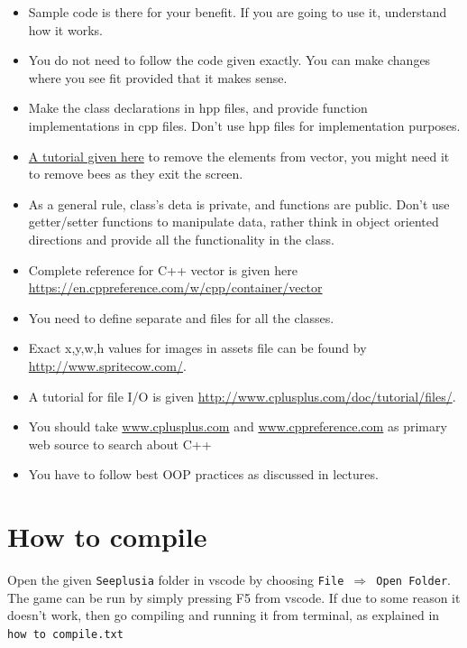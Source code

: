 \documentclass[a4paper,12pt]{article}
\begin{document}
\begin{itemize}
	\item Sample code is there for your benefit. If you are going to use it, understand how it works. 
	\item You do not need to follow the code given exactly. You can make changes where you see fit provided that it makes sense.
	\item Make the class declarations in hpp files, and provide function implementations in cpp files. Don't use hpp files for implementation purposes.
	\item \href{https://www.techiedelight.com/remove-elements-vector-inside-loop-cpp/}{A tutorial given here} to remove the elements from vector, you might need it to remove bees as they exit the screen.
	\item As a general rule, class's deta is private, and functions are public. Don't use getter/setter functions to manipulate data, rather think in object oriented directions and provide all the functionality in the class.
	\item Complete reference for C++ vector is given here \url{https://en.cppreference.com/w/cpp/container/vector}
	\item You need to define separate  and  files for all the classes.
	\item Exact x,y,w,h values for images in assets file can be found by \url{http://www.spritecow.com/}. 
	\item A tutorial for file I/O is given \url{http://www.cplusplus.com/doc/tutorial/files/}. 
	\item You should take \url{www.cplusplus.com} and \url{www.cppreference.com} as primary web source to search about C++
	\item You have to follow best OOP practices as discussed in lectures.
\end{itemize}

\section{How to compile}
Open the given \texttt{Seeplusia} folder in vscode by choosing \texttt{File $\Rightarrow$ Open Folder}. The game can be run by simply pressing F5 from vscode. If due to some reason it doesn't work, then go compiling and running it from terminal, as explained in \texttt{how to compile.txt}
\end{document}

